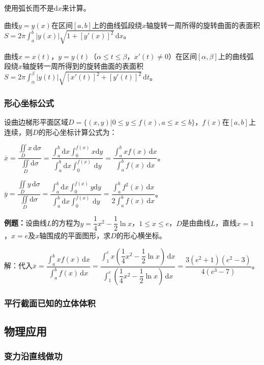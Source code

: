 \documentclass[UTF8, 12pt]{ctexart}
\begin{document}
使用弧长而不是$\textrm{d}x$来计算。

曲线$y=y(x)$在区间$[a,b]$上的曲线弧段绕$x$轴旋转一周所得的旋转曲面的表面积$S=2\pi\int_a^b\vert y(x)\vert\sqrt{1+[y'(x)]^2}\,\textrm{d}x$。

曲线$x=x(t)$，$y=y(t)$（$\alpha\leqslant t\leqslant\beta$，$x'(t)\neq0$）在区间$[\alpha,\beta]$上的曲线弧段绕$x$轴旋转一周所得到的旋转曲面的表面积$S=2\pi\int_\alpha^\beta\vert y(t)\vert\sqrt{[x'(t)]^2+[y'(t)]^2}\,\textrm{d}t$。

\subsubsection{形心坐标公式}

设曲边梯形平面区域$D=\{(x,y)|0\leqslant y\leqslant f(x),a\leqslant x\leqslant b\}$，$f(x)$在$[a,b]$上连续，则$D$的形心坐标计算公式为：

$\overline{x}=\dfrac{\iint\limits_Dx\,\textrm{d}\sigma}{\iint\limits_D\textrm{d}\sigma}=\dfrac{\int_a^b\textrm{d}x\int_0^{f(x)}x\textrm{d}y}{\int_a^b\textrm{d}x\int_0^{f(x)}\,\textrm{d}y}=\dfrac{\int_a^bxf(x)\,\textrm{d}x}{\int_a^bf(x)\,\textrm{d}x}$。

$\overline{y}=\dfrac{\iint\limits_Dy\,\textrm{d}\sigma}{\iint\limits_D\textrm{d}\sigma}=\dfrac{\int_a^b\textrm{d}x\int_0^{f(x)}y\textrm{d}y}{\int_a^b\textrm{d}x\int_0^{f(x)}\,\textrm{d}y}=\dfrac{\int_a^bf^2(x)\,\textrm{d}x}{2\int_a^bf(x)\,\textrm{d}x}$。

\textbf{例题：}设曲线$L$的方程为$y=\dfrac{1}{4}x^2-\dfrac{1}{2}\ln x$，$1\leqslant x\leqslant e$，$D$是由曲线$L$，直线$x=1$，$x=e$及$x$轴围成的平面图形，求$D$的形心横坐标。

解：代入$\overline{x}=\dfrac{\int_a^bxf(x)\,\textrm{d}x}{\int_a^bf(x)\,\textrm{d}x}=\dfrac{\int_1^ex\left(\dfrac{1}{4}x^2-\dfrac{1}{2}\ln x\right)\,\textrm{d}x}{\int_1^e\left(\dfrac{1}{4}x^2-\dfrac{1}{2}\ln x\right)\,\textrm{d}x}=\dfrac{3(e^2+1)(e^2-3)}{4(e^3-7)}$。

\subsubsection{平行截面已知的立体体积}

\subsection{物理应用}

\subsubsection{变力沿直线做功}
\end{document}
